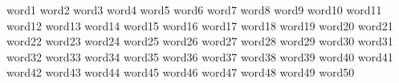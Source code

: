 word1 word2 word3 word4 word5 word6 word7 word8 word9 word10 word11 word12 word13 word14 word15 word16 word17 word18 word19 word20 word21 word22 word23 word24 word25 word26 word27 word28 word29 word30 word31 word32 word33 word34 word35 word36 word37 word38 word39 word40 word41 word42 word43 word44 word45 word46 word47 word48 word49 word50 